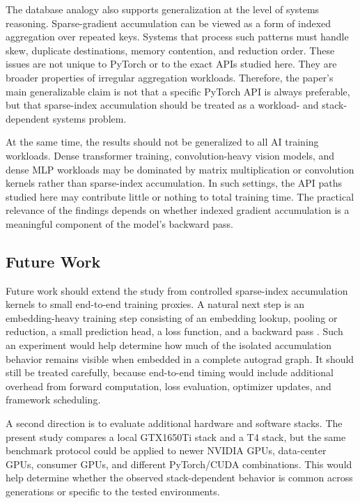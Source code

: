 The database analogy also supports generalization at the level of systems reasoning. Sparse-gradient accumulation can be viewed as a form of indexed aggregation over repeated keys. Systems that process such patterns must handle skew, duplicate destinations, memory contention, and reduction order. These issues are not unique to PyTorch or to the exact APIs studied here. They are broader properties of irregular aggregation workloads. Therefore, the paper's main generalizable claim is not that a specific PyTorch API is always preferable, but that sparse-index accumulation should be treated as a workload- and stack-dependent systems problem.

At the same time, the results should not be generalized to all AI training workloads. Dense transformer training, convolution-heavy vision models, and dense MLP workloads may be dominated by matrix multiplication or convolution kernels rather than sparse-index accumulation. In such settings, the API paths studied here may contribute little or nothing to total training time. The practical relevance of the findings depends on whether indexed gradient accumulation is a meaningful component of the model's backward pass.

\subsection{Future Work}

Future work should extend the study from controlled sparse-index accumulation kernels to small end-to-end training proxies. A natural next step is an embedding-heavy training step consisting of an embedding lookup, pooling or reduction, a small prediction head, a loss function, and a backward pass \cite{gupta2020architectural,pytorchStableEmbedding}. Such an experiment would help determine how much of the isolated accumulation behavior remains visible when embedded in a complete autograd graph. It should still be treated carefully, because end-to-end timing would include additional overhead from forward computation, loss evaluation, optimizer updates, and framework scheduling.

A second direction is to evaluate additional hardware and software stacks. The present study compares a local GTX1650Ti stack and a T4 stack, but the same benchmark protocol could be applied to newer NVIDIA GPUs, data-center GPUs, consumer GPUs, and different PyTorch/CUDA combinations. This would help determine whether the observed stack-dependent behavior is common across generations or specific to the tested environments.


